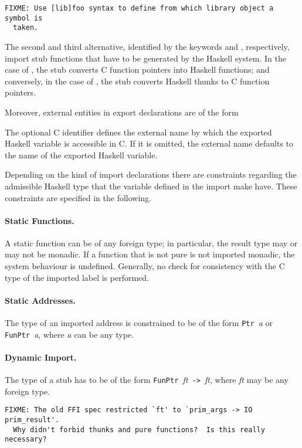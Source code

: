 \documentclass[a4paper,twosides]{article}
\newcommand{\code}[1]{\texttt{#1}}      %
\begin{document}
\begin{verbatim}
FIXME: Use [lib]foo syntax to define from which library object a symbol is
  taken. 
\end{verbatim}

The second and third alternative, identified by the keywords 
and , respectively, import stub functions that have to be
generated by the Haskell system.  In the case of , the stub
converts C function pointers into Haskell functions; and conversely, in the
case of , the stub converts Haskell thunks to C function
pointers.

Moreover, external entities in  export declarations are of the
form
%
\begin{grammar}
\end{grammar}
%
The optional C identifier  defines the external name by which the
exported Haskell variable is accessible in C.  If it is omitted, the external
name defaults to the name of the exported Haskell variable.

Depending on the kind of import declarations there are constraints regarding
the admissible Haskell type that the variable defined in the import make
have.  These constraints are specified in the following.

\paragraph{Static Functions.}
A static function can be of any foreign type; in particular, the result type
may or may not be monadic.  If a function that is not pure is not imported
monadic, the system behaviour is undefined.  Generally, no check for
consistency with the C type of the imported label is performed.

\paragraph{Static Addresses.}
The type of an imported address is constrained to be of the form \code{Ptr
  }\textit{a} or \code{FunPtr }\textit{a}, where \textit{a} can be any type.

\paragraph{Dynamic Import.}
The type of a  stub has to be of the form \code{FunPtr
  }\textit{ft}\code{ -> }\textit{ft}, where \textit{ft} may be any foreign
type.
\begin{verbatim}
FIXME: The old FFI spec restricted `ft' to `prim_args -> IO prim_result'.
  Why didn't forbid thunks and pure functions?  Is this really necessary?
\end{verbatim}
\end{document}
